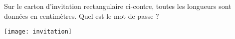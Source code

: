 \begin{enigme}
Sur le carton d'invitation rectangulaire ci-contre, toutes les longueurs sont données en centimètres. Quel est le mot de passe ?
\begin{center} \texttt{[image: invitation]} \end{center}
 
 \end{enigme}
 

 
